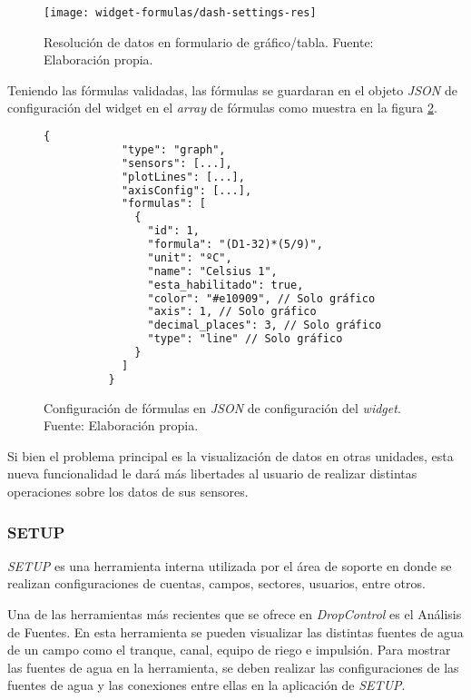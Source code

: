 \begin{figure}[H]
	\centering
	\texttt{[image: widget-formulas/dash-settings-res]}
	\caption{\label{fig:dash-settings-res} Resolución de datos en formulario de gráfico/tabla. Fuente: Elaboración propia.}
\end{figure}

Teniendo las fórmulas validadas, las fórmulas se guardaran en el objeto \textit{JSON} de configuración del widget en el \textit{array} de fórmulas como muestra en la figura \ref{fig:ejemplo-formula-json}.
\begin{figure}[H]
    \centering
    \begin{lstlisting}[language=XML, frame=single, basicstyle=\ttfamily\small]
        {
            "type": "graph",
            "sensors": [...],
            "plotLines": [...],
            "axisConfig": [...],
            "formulas": [
              {
                "id": 1,
                "formula": "(D1-32)*(5/9)",
                "unit": "ºC",
                "name": "Celsius 1",
                "esta_habilitado": true,
                "color": "#e10909", // Solo gráfico
                "axis": 1, // Solo gráfico
                "decimal_places": 3, // Solo gráfico
                "type": "line" // Solo gráfico
              }
            ]
          }
    \end{lstlisting}
    \caption{Configuración de fórmulas en \textit{JSON} de configuración del \textit{widget}. Fuente: Elaboración propia.}
    \label{fig:ejemplo-formula-json}
\end{figure}
Si bien el problema principal es la visualización de datos en otras unidades, esta nueva funcionalidad le dará más libertades al usuario de realizar distintas operaciones sobre los datos de sus sensores.

\iffalse
\subsubsection{SETUP}

\textit{SETUP} es una herramienta interna utilizada por el área de soporte en donde se realizan configuraciones de cuentas, campos, sectores, usuarios, entre otros.


Una de las herramientas más recientes que se ofrece en \textit{DropControl} es el Análisis de Fuentes. En esta herramienta se pueden visualizar las distintas fuentes de agua de un campo como el tranque, canal, equipo de riego e impulsión.
Para mostrar las fuentes de agua en la herramienta, se deben realizar las configuraciones de las fuentes de agua y las conexiones entre ellas en la aplicación de \textit{SETUP}.

